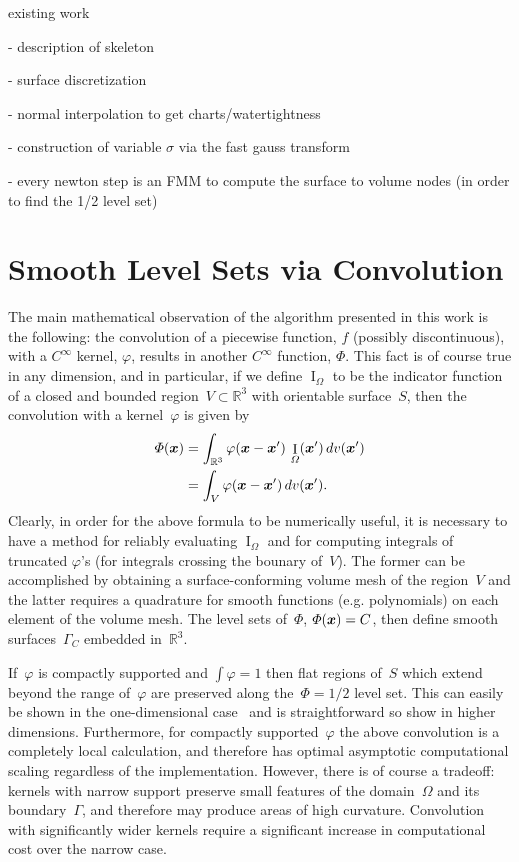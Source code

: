 \documentclass[11pt]{article}
\numberwithin{equation}{section}
\newcommand{\vct}{\vectorsym}
\DeclareMathOperator\indic{I}
\newcommand\bbR{\mathbb R}
\newcommand\bx{\vct{x}}
\renewcommand{\phi}{\varphi}
\begin{document}
existing
work~\cite{fleishman2005,bloomenthal1991,sherstyuk1999,sherstyuk1999design}


- description of skeleton

- surface discretization

- normal interpolation to get charts/watertightness

- construction of variable $\sigma$ via the fast gauss transform

- every newton step is an FMM to compute the surface to volume nodes
(in order to find the 1/2 level set)



\section{Smooth Level Sets via Convolution}
\label{sec:smooth}

The main mathematical observation of the algorithm presented in this
work is the following: the convolution of a piecewise function, $f$
(possibly discontinuous), with a $C^\infty$ kernel, $\phi$, results in
another $C^\infty$ function, $\Phi$. This fact is of course true in any
dimension, and in particular, if we define $\indic_\Omega$ to be the
indicator function of a closed and bounded
region~$V \subset \bbR^3$ with orientable surface~$S$, then
the convolution with a kernel~$\phi$ is given by
\begin{equation}
\begin{aligned}
\Phi(\bx) &= \int_{\bbR^3} \phi(\bx-\bx') \, \indic_\Omega(\bx') \, dv(\bx') \\
 &= \int_{V} \phi(\bx-\bx')  \, dv(\bx').
\end{aligned}
\end{equation}
Clearly, in order for the above formula to be numerically useful, it
is necessary to have a method for reliably evaluating $\indic_\Omega$
and for computing integrals of truncated $\phi$'s (for integrals
crossing the bounary of~$V$). The former can be
accomplished by obtaining a surface-conforming volume mesh of the
region~$V$ and the latter requires a quadrature for smooth
functions (e.g. polynomials) on each element of the volume mesh. The
level sets of~$\Phi$, $\Phi(\bx) = C$, then define smooth
surfaces~$\Gamma_C$ embedded in~$\bbR^3$.

If~$\phi$ is compactly supported and $\int \phi = 1$ then flat regions
of~$S$ which extend beyond the range of~$\phi$ are preserved
along the~$\Phi = 1/2$ level set. This can easily be shown in the
one-dimensional case~\cite{epstein_2016} and is straightforward so
show in higher dimensions. Furthermore, for compactly supported~$\phi$
the above convolution is a completely local calculation, and therefore
has optimal asymptotic computational scaling regardless of the
implementation. However, there is of course a tradeoff: kernels with
narrow support preserve small features of the domain~$\Omega$ and its
boundary~$\Gamma$, and therefore may produce areas of high
curvature. Convolution with significantly wider kernels require a
significant increase in computational cost over the narrow case.
\end{document}
